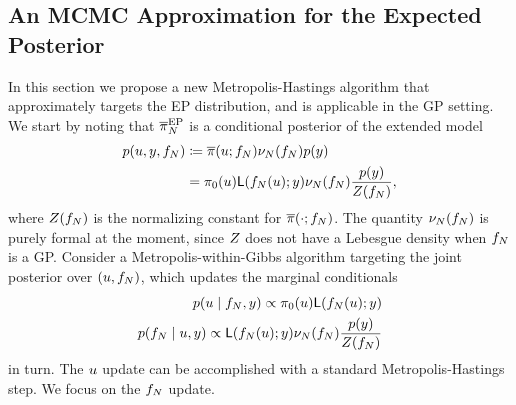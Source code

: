 \documentclass[12pt]{article}
\begin{document}
\subsection{An MCMC Approximation for the Expected Posterior} \label{sec:mcmc-ep}
In this section we propose a new Metropolis-Hastings algorithm that approximately targets 
the EP distribution, and is applicable in the GP setting. We start by noting that $\overline{\pi}_{N}^{\mathrm{EP}}$
is a conditional posterior of the extended model 
\begin{align}
p(u, y, f_{N}) &\coloneqq
\overline{\pi}(u; f_{N}) \nu_{N}(f_{N}) p(y) \\
&= \pi_0(u) \mathsf{L}(f_{N}(u); y) \nu_{N}(f_{N}) \frac{p(y)}{Z(f_{N})},
\label{eq:EP-prob-model}
\end{align}
where $Z(f_{N})$ is the normalizing constant for $\overline{\pi}(\cdot; f_{N})$.
The quantity $\nu_{N}(f_{N})$ is purely formal at the moment, since $Z$ does not 
have a Lebesgue density when $f_{N}$ is a GP.  Consider a Metropolis-within-Gibbs algorithm 
targeting the joint posterior over $(u, f_{N})$, which updates the marginal conditionals  
\begin{align}
p(u \mid f_{N}, y) \propto \pi_0(u) \mathsf{L}(f_{N}(u); y) \label{eq:EP-conditionals} \\
p(f_{N} \mid u, y) \propto \mathsf{L}(f_{N}(u); y) \nu_{N}(f_{N}) \frac{p(y)}{Z(f_{N})}
\end{align}
in turn. The $u$ update can be accomplished with a standard Metropolis-Hastings step. We focus on the
$f_{N}$ update.
\end{document}
